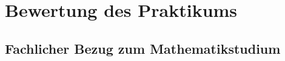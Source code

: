 \documentclass[a4paper]{scrartcl}
\begin{document}



\section{Bewertung des Praktikums}
\label{sec:bewert-des-prakt}

\subsection{Fachlicher Bezug zum Mathematikstudium}
\label{sec:fachlicher-bezug-zum}
\end{document}
